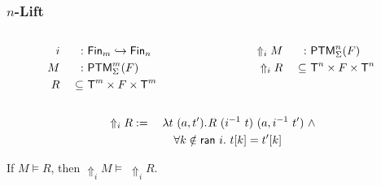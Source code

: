 \documentclass{beamer} %
\renewcommand{\Tape}{\MS{T}}
\renewcommand{\VDash}{\vDash}
\begin{document}
\begin{frame}
  \frametitle{$n$-Lift}

  \begin{columns}
    \begin{column}{0.5\textwidth}
      \begin{alignat*}{2}
      i ~&&         :&~ \Fin_m \hookrightarrow \Fin_n \\
      M ~&&         :&~ \MS{PTM}_\Sigma^m(F) \\
      R ~&& \subseteq&~ \Tape^m \times F \times \Tape^m
      \end{alignat*}
    \end{column}
    \begin{column}{0.5\textwidth}
      \begin{alignat*}{2}
        \Uparrow_i M ~&&         : &~ \MS{PTM}_\Sigma^n(F) \\
        \Uparrow_i R ~&& \subseteq &~ \Tape^n \times F \times \Tape^n
      \end{alignat*}
    \end{column}
  \end{columns}

  \begin{alignat*}{2}
    & \Uparrow_i R  :=\;&& \lam{t~(a, t')} R~(i^{-1}~t)~(a, i^{-1}~t') ~\land \\
    &&&\quad \forall k \notin \MS{ran}~i.~t[k] = t'[k]
  \end{alignat*}

  \begin{lemma}
    If $M \VDash R$, then $\Uparrow_i M  \VDash\; \Uparrow_i R$.
  \end{lemma}
\end{frame}
\end{document}
